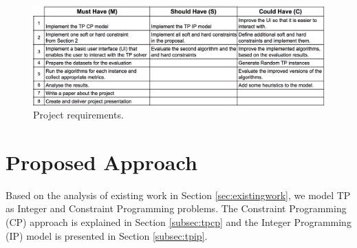 \documentclass{mprop}
\makeatletter
\theoremstyle{definition}
\newcommand{\specialcell}[2][c]{%
  \begin{tabular}[#1]{@{}c@{}}#2\end{tabular}}
\makeatother
\begin{document}
\begin{figure}
\centering
\includegraphics[width = 16cm, height = 6 cm]{images/requirements.png}
\caption{Project requirements.}
\label{fig:requirements}
\end{figure}



\section{Proposed Approach}
\label{sec:proposedapproach}
Based on the analysis of existing work in Section \ref{sec:existingwork}, we model TP as Integer and Constraint Programming problems. The Constraint Programming (CP) approach is explained in Section \ref{subsec:tpcp} and the Integer Programming (IP) model is presented in Section \ref{subsec:tpip}.
\end{document}
